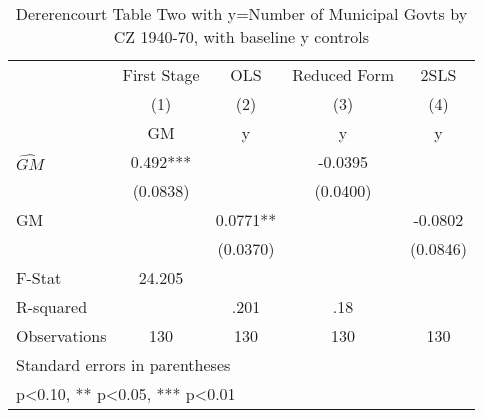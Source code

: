 \begin{table}[htbp]\centering
\def\sym#1{\ifmmode^{#1}\else\(^{#1}\)\fi}
\caption{Dererencourt Table Two with y=Number of Municipal Govts by CZ 1940-70, with baseline y controls}
\begin{tabular}{l*{4}{c}}
\toprule
                    & First Stage   &         OLS   &Reduced Form   &        2SLS   \\
                    &\multicolumn{1}{c}{(1)}&\multicolumn{1}{c}{(2)}&\multicolumn{1}{c}{(3)}&\multicolumn{1}{c}{(4)}\\
                    &\multicolumn{1}{c}{GM}&\multicolumn{1}{c}{y}&\multicolumn{1}{c}{y}&\multicolumn{1}{c}{y}\\
\midrule
$\hat{GM}$          &       0.492***&               &     -0.0395   &               \\
                    &    (0.0838)   &               &    (0.0400)   &               \\
\addlinespace
GM                  &               &      0.0771** &               &     -0.0802   \\
                    &               &    (0.0370)   &               &    (0.0846)   \\
\midrule
F-Stat              &      24.205   &               &               &               \\
R-squared           &               &        .201   &         .18   &               \\
Observations        &         130   &         130   &         130   &         130   \\
\bottomrule
\multicolumn{5}{l}{\footnotesize Standard errors in parentheses}\\
\multicolumn{5}{l}{\footnotesize * p<0.10, ** p<0.05, *** p<0.01}\\
\end{tabular}
\end{table}
